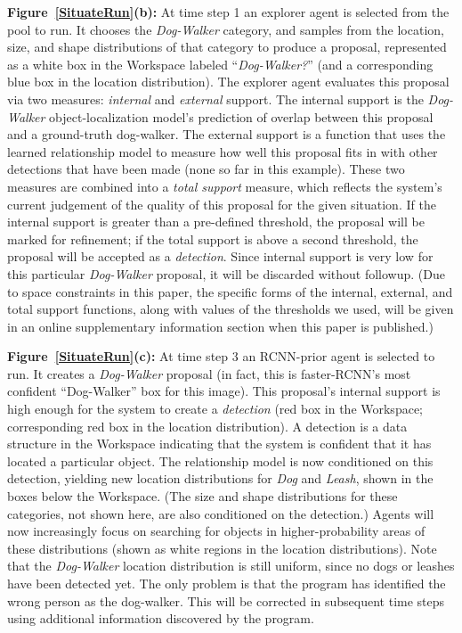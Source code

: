 \documentclass[conference]{IEEEtran}
\begin{document}
{\bf Figure~\ref{SituateRun}(b):} At time step 1 an explorer agent is
selected from the pool to run.  It chooses the {\it Dog-Walker}
category, and samples from the location, size, and shape distributions
of that category to produce a proposal, represented as a white box in
the Workspace labeled ``{\it Dog-Walker?}'' (and a corresponding blue
box in the location distribution).  The explorer agent evaluates this
proposal via two measures: {\it internal} and {\it external} support.
The internal support is the {\it Dog-Walker} object-localization model's
prediction of overlap between this proposal and a ground-truth
dog-walker.  The external support is a function that uses the learned
relationship model to measure how well this proposal fits in with other
detections that have been made (none so far in this example).  These
two measures are combined into a {\it total support} measure, which
reflects the system's current judgement of the quality of this
proposal for the given situation.  If the internal support is greater
than a pre-defined threshold, the proposal will be marked for 
refinement; if the total support is above a second threshold, the
proposal will be accepted as a {\it detection}.  Since internal
support is very low for this particular {\it Dog-Walker} proposal, it
will be discarded without followup.  (Due to space constraints in this paper, the
specific forms of the internal, external, and total support functions,
along with values of the thresholds we used, will be given in an
online supplementary information section when this paper is
published.)

{\bf Figure~\ref{SituateRun}(c):} At time step 3 an RCNN-prior agent
is selected to run.  It creates a {\it Dog-Walker} proposal (in fact,
this is faster-RCNN's most confident ``Dog-Walker'' box for this
image).  This proposal's internal support is high enough for the
system to create a {\it detection} (red box in the Workspace;
corresponding red box in the location distribution).  A detection is a
data structure in the Workspace indicating that the system is
confident that it has located a particular object.  The relationship model
is now conditioned on this detection, yielding new location
distributions for {\it Dog} and {\it Leash}, shown in the boxes below
the Workspace.  (The size and shape distributions for these
categories, not shown here, are also conditioned on the detection.)
Agents will now increasingly focus on searching for objects in
higher-probability areas of these distributions (shown as white regions in the
location distributions).  Note that the {\it Dog-Walker} location
distribution is still uniform, since no dogs or leashes have been
detected yet.  The only problem is that the program has identified the
wrong person as the dog-walker.  This will be corrected in subsequent
time steps using additional information discovered by the program.
\end{document}
